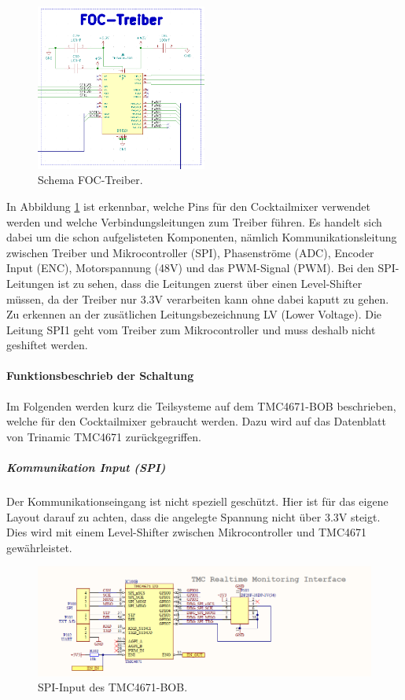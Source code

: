 \begin{figure}[h!]
	\centering
	\includegraphics[width=0.5\textwidth]{graphics/Schema_FOC_Treiber}
	\caption{Schema FOC-Treiber.}
	\label{fig:Schema_FOC_Treiber}
\end{figure} 

In Abbildung \ref{fig:Schema_FOC_Treiber} ist erkennbar, welche Pins für den Cocktailmixer verwendet werden und welche Verbindungsleitungen zum Treiber führen. Es handelt sich dabei um die schon aufgelisteten Komponenten, nämlich Kommunikationsleitung zwischen Treiber und Mikrocontroller (SPI), Phasenströme (ADC), Encoder Input (ENC), Motorspannung (48V) und das PWM-Signal (PWM). Bei den SPI-Leitungen ist zu sehen, dass die Leitungen zuerst über einen Level-Shifter müssen, da der Treiber nur 3.3V verarbeiten kann ohne dabei kaputt zu gehen. Zu erkennen an der zusätlichen Leitungsbezeichnung LV (Lower Voltage). Die Leitung SPI1 geht vom Treiber zum Mikrocontroller und muss deshalb nicht geshiftet werden.

\newpage

\paragraph{Funktionsbeschrieb der Schaltung}\mbox{}

Im Folgenden werden kurz die Teilsysteme auf dem TMC4671-BOB beschrieben, welche für den Cocktailmixer gebraucht werden. Dazu wird auf das Datenblatt von Trinamic TMC4671 zurückgegriffen.

\subparagraph{Kommunikation Input (SPI)}

Der Kommunikationseingang ist nicht speziell geschützt. Hier ist für das eigene Layout darauf zu achten, dass die angelegte Spannung nicht über 3.3V steigt. Dies wird mit einem Level-Shifter zwischen Mikrocontroller und TMC4671 gewährleistet.

\begin{figure}[h!]
	\centering
	\includegraphics[width=\textwidth]{graphics/TMC4671_SPI_BOB_Schematic}
	\caption{SPI-Input des TMC4671-BOB.}
	\label{fig:Schema_SPI_FOC_Treiber}
\end{figure} 

